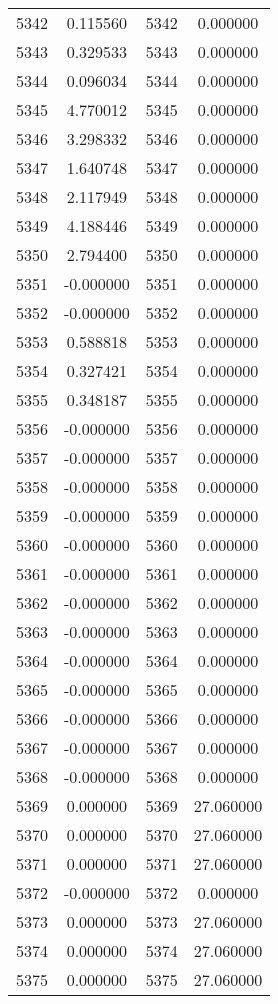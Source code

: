 \documentclass[12pt]{article}
\begin{document}
\begin{longtable}{@{}cccc@{}}
5342 & 0.115560 & 5342 & 0.000000 \\
5343 & 0.329533 & 5343 & 0.000000 \\
5344 & 0.096034 & 5344 & 0.000000 \\
5345 & 4.770012 & 5345 & 0.000000 \\
5346 & 3.298332 & 5346 & 0.000000 \\
5347 & 1.640748 & 5347 & 0.000000 \\
5348 & 2.117949 & 5348 & 0.000000 \\
5349 & 4.188446 & 5349 & 0.000000 \\
5350 & 2.794400 & 5350 & 0.000000 \\
5351 & -0.000000 & 5351 & 0.000000 \\
5352 & -0.000000 & 5352 & 0.000000 \\
5353 & 0.588818 & 5353 & 0.000000 \\
5354 & 0.327421 & 5354 & 0.000000 \\
5355 & 0.348187 & 5355 & 0.000000 \\
5356 & -0.000000 & 5356 & 0.000000 \\
5357 & -0.000000 & 5357 & 0.000000 \\
5358 & -0.000000 & 5358 & 0.000000 \\
5359 & -0.000000 & 5359 & 0.000000 \\
5360 & -0.000000 & 5360 & 0.000000 \\
5361 & -0.000000 & 5361 & 0.000000 \\
5362 & -0.000000 & 5362 & 0.000000 \\
5363 & -0.000000 & 5363 & 0.000000 \\
5364 & -0.000000 & 5364 & 0.000000 \\
5365 & -0.000000 & 5365 & 0.000000 \\
5366 & -0.000000 & 5366 & 0.000000 \\
5367 & -0.000000 & 5367 & 0.000000 \\
5368 & -0.000000 & 5368 & 0.000000 \\
5369 & 0.000000 & 5369 & 27.060000 \\
5370 & 0.000000 & 5370 & 27.060000 \\
5371 & 0.000000 & 5371 & 27.060000 \\
5372 & -0.000000 & 5372 & 0.000000 \\
5373 & 0.000000 & 5373 & 27.060000 \\
5374 & 0.000000 & 5374 & 27.060000 \\
5375 & 0.000000 & 5375 & 27.060000 \\

\end{longtable}
\end{document}
